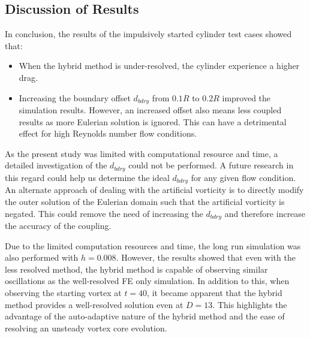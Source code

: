 

\subsection{Discussion of Results}	

In conclusion, the results of the impulsively started cylinder test cases showed that:
\begin{itemize}
\item When the hybrid method is under-resolved, the cylinder experience a higher drag.
\item Increasing the boundary offset $d_{bdry}$ from $0.1R$ to $0.2R$ improved the simulation results. However, an increased offset also means less coupled results as more Eulerian solution is ignored. This can have a detrimental effect for high Reynolds number flow conditions.
\end{itemize}

As the present study was limited with computational resource and time, a detailed investigation of the $d_{bdry}$ could not be performed. A future research in this regard could help us determine the ideal $d_{bdry}$ for any given flow condition. An alternate approach of dealing with the artificial vorticity is to directly modify the outer solution of the Eulerian domain such that the artificial vorticity is negated. This could remove the need of increasing the $d_{bdry}$ and therefore increase the accuracy of the coupling.

Due to the limited computation resources and time, the long run simulation was also performed with $h=0.008$. However, the results showed that even with the less resolved method, the hybrid method is capable of observing similar oscillations as the well-resolved FE only simulation. In addition to this, when observing the starting vortex at $t=40$, it became apparent that the hybrid method provides a well-resolved solution even at $D=13$. This highlights the advantage of the auto-adaptive nature of the hybrid method and the ease of resolving an unsteady vortex core evolution.




